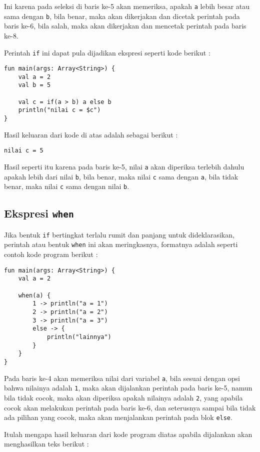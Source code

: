 Ini karena pada seleksi di baris ke-5 akan memeriksa, apakah \texttt{a} lebih besar atau sama dengan \texttt{b}, bila benar, maka akan dikerjakan dan dicetak perintah pada baris ke-6, bila salah, maka akan dikerjakan dan mencetak perintah pada baris ke-8.

Perintah \texttt{if} ini dapat pula dijadikan ekspresi seperti kode berikut :

\begin{lstlisting}
fun main(args: Array<String>) {
	val a = 2
	val b = 5
	
	val c = if(a > b) a else b
	println("nilai c = $c")
}
\end{lstlisting}

Hasil keluaran dari kode di atas adalah sebagai berikut :

\begin{lstlisting}
nilai c = 5
\end{lstlisting}

Hasil seperti itu karena pada baris ke-5, nilai \texttt{a} akan diperiksa terlebih dahulu apakah lebih dari nilai \texttt{b}, bila benar, maka nilai \texttt{c} sama dengan \texttt{a}, bila tidak benar, maka nilai \texttt{c} sama dengan nilai \texttt{b}.

\subsection{Ekspresi \texttt{when}}

Jika bentuk \texttt{if} bertingkat terlalu rumit dan panjang untuk dideklarasikan, perintah atau bentuk \texttt{when} ini akan meringkasnya, formatnya adalah seperti contoh kode program berikut :

\begin{lstlisting}
fun main(args: Array<String>) {
	val a = 2
	
	when(a) {
		1 -> println("a = 1")
		2 -> println("a = 2")
		3 -> println("a = 3")
		else -> {
			println("lainnya")
		}
	}
}
\end{lstlisting}

Pada baris ke-4 akan memeriksa nilai dari variabel \texttt{a}, bila sesuai dengan opsi bahwa nilainya adalah \texttt{1}, maka akan dijalankan perintah pada baris ke-5, namun bila tidak cocok, maka akan diperiksa apakah nilainya adalah \texttt{2}, yang apabila cocok akan melakukan perintah pada baris ke-6, dan seterusnya sampai bila tidak ada pilihan yang cocok, maka akan menjalankan perintah pada blok \texttt{else}.

Itulah mengapa hasil keluaran dari kode program diatas apabila dijalankan akan menghasilkan teks berikut :

